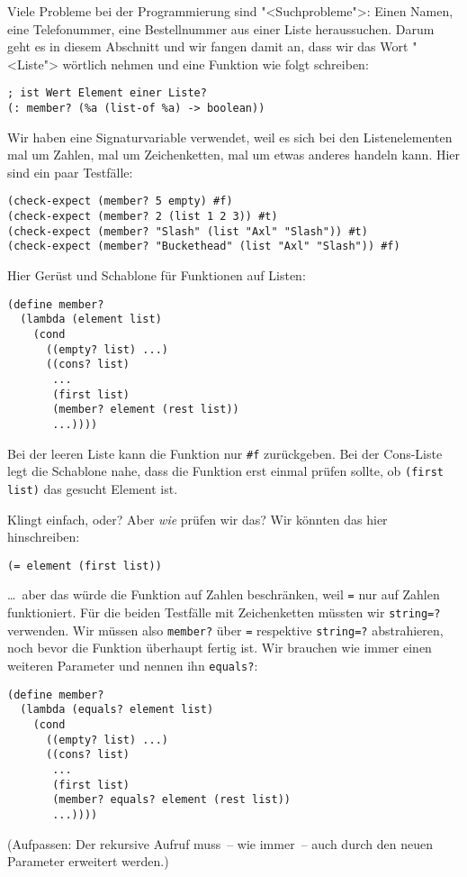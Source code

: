 Viele Probleme bei der Programmierung sind "<Suchprobleme">: Einen
Namen, eine Telefonummer, eine Bestellnummer aus einer Liste
heraussuchen.  Darum geht es in diesem Abschnitt und wir fangen damit
an, dass wir das Wort "<Liste"> wörtlich nehmen und eine Funktion wie
folgt schreiben:
%
\begin{lstlisting}
; ist Wert Element einer Liste?
(: member? (%a (list-of %a) -> boolean))
\end{lstlisting}
%
Wir haben eine Signaturvariable verwendet, weil es sich bei den
Listenelementen mal um Zahlen, mal um Zeichenketten, mal um etwas
anderes handeln kann.  Hier sind ein paar Testfälle:
%
\begin{lstlisting}
(check-expect (member? 5 empty) #f)
(check-expect (member? 2 (list 1 2 3)) #t)
(check-expect (member? "Slash" (list "Axl" "Slash")) #t)
(check-expect (member? "Buckethead" (list "Axl" "Slash")) #f)
\end{lstlisting}
%
Hier Gerüst und Schablone für Funktionen auf Listen:
%
\begin{lstlisting}
(define member?
  (lambda (element list)
    (cond
      ((empty? list) ...)
      ((cons? list)
       ... 
       (first list)
       (member? element (rest list))
       ...))))
\end{lstlisting}
%
Bei der leeren Liste kann die Funktion nur \lstinline{#f}
zurückgeben.  Bei der Cons-Liste legt die Schablone nahe, dass die
Funktion erst einmal prüfen sollte, ob \lstinline{(first list)} das
gesucht Element ist.

Klingt einfach, oder?  Aber \emph{wie} prüfen wir das?  Wir könnten
das hier hinschreiben:
%
\begin{lstlisting}
(= element (first list))
\end{lstlisting}
%
\ldots~aber das würde die Funktion auf Zahlen beschränken, weil
\lstinline{=} nur auf Zahlen funktioniert.  Für die beiden Testfälle
mit Zeichenketten müssten wir \lstinline{string=?} verwenden.  Wir
müssen also \lstinline{member?} über \lstinline{=} respektive
\lstinline{string=?} abstrahieren, noch bevor die Funktion überhaupt
fertig ist.  Wir brauchen wie immer einen weiteren Parameter und
nennen ihn \lstinline{equals?}:\label{func:memberp}
%
\begin{lstlisting}
(define member?
  (lambda (equals? element list)
    (cond
      ((empty? list) ...)
      ((cons? list)
       ... 
       (first list)
       (member? equals? element (rest list))
       ...))))
\end{lstlisting}
%
(Aufpassen: Der rekursive Aufruf muss~-- wie immer~-- auch durch den
neuen Parameter erweitert werden.)

